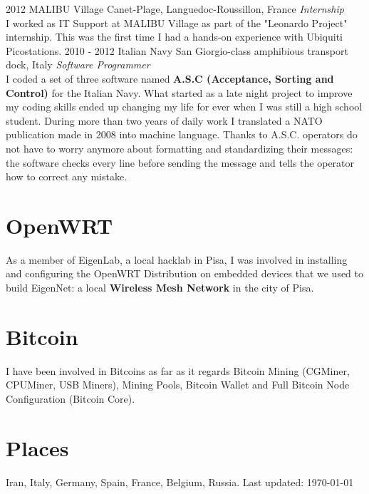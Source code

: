 \documentclass[]{friggeri-cv} %
\begin{document}
\begin{entrylist}
\entry
{2012}
{MALIBU Village}
{Canet-Plage, Languedoc-Roussillon, France}
{\emph{Internship} \\
I worked as IT Support at MALIBU Village as part of the "Leonardo Project" internship. This was the first time I had a hands-on experience with Ubiquiti Picostations.}
\entry
{2010 - 2012}
{Italian Navy}
{San Giorgio-class amphibious transport dock, Italy}
{\emph{Software Programmer} \\
I coded a set of three software named \textbf{A.S.C (Acceptance, Sorting and Control)} for the Italian Navy. What started as a late night project to improve my coding skills ended up changing my life for ever when I was still a high school student. During more than two years of daily work I translated a NATO publication made in 2008 into machine language. Thanks to A.S.C. operators do not have to worry anymore about formatting and standardizing their messages: the software checks every line before sending the message and tells the operator how to correct any mistake.}
\end{entrylist}

\newpage


\begin{aside}
\section{OpenWRT \textcolor{green}{\faWifi}}
As a member of EigenLab, a local hacklab in Pisa, I was involved in installing and configuring the OpenWRT Distribution on embedded devices that we used to build EigenNet: a local \textbf{Wireless Mesh Network} in the city of Pisa.\vspace{6mm}
\section{Bitcoin \textcolor{red}{\faBitcoin}}
I have been involved in Bitcoins as far as it regards Bitcoin Mining (CGMiner, CPUMiner, USB Miners), Mining Pools, Bitcoin Wallet and Full Bitcoin Node Configuration (Bitcoin Core).\vspace{6mm}
\section{Places \textcolor{light-blue}{\faMapMarker}}
Iran, Italy, Germany, Spain, France, Belgium, Russia.\vspace{6mm}
\small{Last updated: \today\ }
\end{aside}
\end{document}
